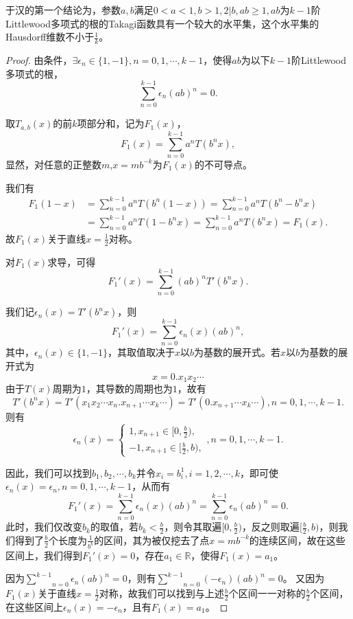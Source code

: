 于汉的第一个结论为，参数$a,b$满足$0<a<1,b>1,2|b,ab\ge1,ab$为$k-1$阶Littlewood多项式的根的Takagi函数具有一个较大的水平集，这个水平集的Hausdorff维数不小于$\frac{1}{k}$。

\begin{proof}
    由条件，$\exists\epsilon_n\in\{1,-1\},n=0,1,\cdots,k-1$，使得$ab$为以下$k-1$阶Littlewood多项式的根，
    $$
        \sum_{n=0}^{k-1}\epsilon_n(ab)^n=0.
    $$

    取$T_{a,b}(x)$的前$k$项部分和，记为$F_1(x)$，
    $$
        F_1(x)=\sum_{n=0}^{k-1}a^nT(b^nx),
    $$
    显然，对任意的正整数$m$,$x=mb^{-k}$为$F_1(x)$的不可导点。

    我们有
    $$
        \begin{aligned}
            F_1(1-x) & =\sum_{n=0}^{k-1}a^nT(b^n(1-x))=\sum_{n=0}^{k-1}a^nT(b^n-b^nx) \\
                   & =\sum_{n=0}^{k-1}a^nT(1-b^nx)=\sum_{n=0}^{k-1}a^nT(b^nx)=F_1(x).
        \end{aligned}
    $$
    故$F_1(x)$关于直线$x=\frac{1}{2}$对称。

    对$F_1(x)$求导，可得
    $$
        F_1'(x)=\sum_{n=0}^{k-1}(ab)^nT'(b^nx).
    $$

    我们记$\epsilon_n(x)=T'(b^nx)$，则
    $$
        F_1'(x)=\sum_{n=0}^{k-1}\epsilon_n(x)(ab)^n,
    $$
    其中，$\epsilon_n(x)\in\{1,-1\}$，其取值取决于$x$以$b$为基数的展开式。若$x$以$b$为基数的展开式为
    $$
        x=0.x_1x_2\cdots
    $$
    由于$T(x)$周期为$1$，其导数的周期也为$1$，故有
    $$
        T'(b^nx)=T'(x_1x_2\cdots x_n.x_{n+1}\cdots x_k\cdots)=T'(0.x_{n+1}\cdots x_k\cdots),n=0,1,\cdots,k-1.
    $$
    则有
    $$
        \epsilon_n(x)=
        \begin{cases}
            1,x_{n+1}\in[0,\frac{b}{2}),\\
            -1,x_{n+1}\in[\frac{b}{2},b),
        \end{cases},n=0,1,\cdots,k-1.
    $$

    因此，我们可以找到$b_1,b_2,\cdots,b_k$并令$x_i=b^1_i,i=1,2,\cdots,k$，即可使$\epsilon_n(x)=\epsilon_n,n=0,1,\cdots,k-1$，从而有
    $$
        F_1'(x)=\sum_{n=0}^{k-1}\epsilon_n(x)(ab)^n=\sum_{n=0}^{k-1}\epsilon_n(ab)^n=0.
    $$
    此时，我们仅改变$b_k$的取值，若$b_k<\frac{b}{2}$，则令其取遍$[0,\frac{b}{2})$，反之则取遍$[\frac{b}{2},b)$，则我们得到了$\frac{b}{2}$个长度为$\frac{1}{b^k}$的区间，其为被仅挖去了点$x=mb^{-k}$的连续区间，故在这些区间上，我们得到$F_1'(x)=0$，存在$a_1\in\mathbb{R}$，使得$F_1(x)=a_1$。

    因为$\underset{n=0}{\overset{k-1}{\sum}}\epsilon_n(ab)^n=0$，则有$\underset{n=0}{\overset{k-1}{\sum}}(-\epsilon_n)(ab)^n=0$。
    又因为$F_1(x)$关于直线$x=\frac{1}{2}$对称，故我们可以找到与上述$\frac{b}{2}$个区间一一对称的$\frac{b}{2}$个区间，在这些区间上$\epsilon_n(x)=-\epsilon_n$，且有$F_1(x)=a_1$。


\end{proof}
